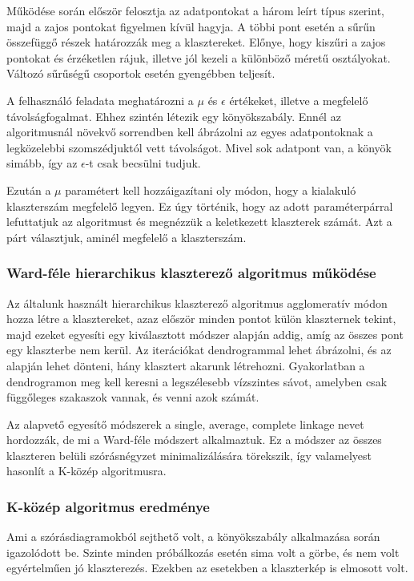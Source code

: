 \documentclass[12pt]{article}
\begin{document}
Működése során először felosztja az adatpontokat a három leírt típus szerint, majd a zajos pontokat figyelmen kívül hagyja. A többi pont esetén a sűrűn összefüggő részek határozzák meg a klasztereket. Előnye, hogy kiszűri a zajos pontokat és érzéketlen rájuk, illetve jól kezeli a különböző méretű osztályokat. Változó sűrűségű csoportok esetén gyengébben teljesít.

A felhasználó feladata meghatározni a $\mu$ és $\epsilon$ értékeket, illetve a megfelelő távolságfogalmat. Ehhez szintén létezik egy könyökszabály. Ennél az algoritmusnál növekvő sorrendben kell ábrázolni az egyes adatpontoknak a legközelebbi szomszédjuktól vett távolságot. Mivel sok adatpont van, a könyök simább, így az $\epsilon$-t csak becsülni tudjuk. 

Ezután a $\mu$ paramétert kell hozzáigazítani oly módon, hogy a kialakuló klaszterszám megfelelő legyen. Ez úgy történik, hogy az adott paraméterpárral lefuttatjuk az algoritmust és megnézzük a keletkezett klaszterek számát. Azt a párt választjuk, aminél megfelelő a klaszterszám.

\subsubsection{Ward-féle hierarchikus klaszterező algoritmus működése}

Az általunk használt hierarchikus klaszterező algoritmus agglomeratív módon hozza létre a klasztereket, azaz először minden pontot külön klaszternek tekint, majd ezeket egyesíti egy kiválasztott módszer alapján addig, amíg az összes pont egy klaszterbe nem kerül. Az iterációkat dendrogrammal lehet ábrázolni, és az alapján lehet dönteni, hány klasztert akarunk létrehozni. Gyakorlatban a dendrogramon meg kell keresni a legszélesebb vízszintes sávot, amelyben csak függőleges szakaszok vannak, és venni azok számát.

Az alapvető egyesítő módszerek a single, average, complete linkage nevet hordozzák, de mi a Ward-féle módszert alkalmaztuk. Ez a módszer az összes klaszteren belüli szórásnégyzet minimalizálására törekszik, így valamelyest hasonlít a K-közép algoritmusra.

\subsubsection{K-közép algoritmus eredménye}
Ami a szórásdiagramokból sejthető volt, a könyökszabály alkalmazása során igazolódott be. Szinte minden próbálkozás esetén sima volt a görbe, és nem volt egyértelműen jó klaszterezés. Ezekben az esetekben a klaszterkép is elmosott volt.
\end{document}
